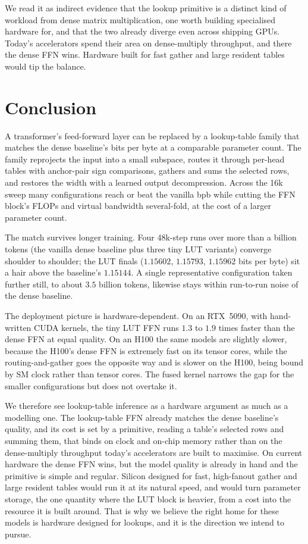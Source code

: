 \documentclass[11pt]{article}
\begin{document}
We read it as indirect evidence
that the lookup primitive is a distinct kind of workload from dense matrix multiplication, one
worth building specialised hardware for, and that the two already diverge even across shipping
GPUs. Today's accelerators spend their area on
dense-multiply throughput, and there the dense FFN wins. Hardware built for fast gather and large
resident tables would tip the balance.

\clearpage
\section{Conclusion}

A transformer's feed-forward layer can be replaced by a lookup-table family that matches the
dense baseline's bits per byte at a comparable parameter count. The family reprojects the input
into a small subspace, routes it through per-head tables with anchor-pair sign comparisons,
gathers and sums the selected rows, and restores the width with a learned output decompression.
Across the 16k sweep many configurations reach or beat the vanilla bpb while cutting the FFN
block's FLOPs and virtual bandwidth several-fold, at the cost of a larger parameter count.

The match survives longer training. Four 48k-step runs over more than a billion tokens (the
vanilla dense baseline plus three tiny LUT variants) converge shoulder to shoulder; the LUT
finals ($1.15602$, $1.15793$, $1.15962$ bits per byte) sit a hair above the baseline's $1.15144$. A
single representative configuration taken further still, to about $3.5$ billion tokens, likewise
stays within run-to-run noise of the dense baseline.

The deployment picture is hardware-dependent. On an RTX~5090, with hand-written CUDA
kernels, the tiny LUT FFN runs $1.3$ to $1.9$ times faster than the dense FFN at equal quality.
On an H100 the same models are slightly slower, because the H100's dense FFN is extremely fast on
its tensor cores, while the routing-and-gather goes the opposite way and is slower on the H100,
being bound by SM clock rather than tensor cores. The fused kernel narrows the gap for the
smaller configurations but does not overtake it.

We therefore see lookup-table inference as a hardware argument as much as a modelling one. The
lookup-table FFN already matches the dense baseline's quality, and its cost is set by a primitive, reading a
table's selected rows and summing them, that binds on clock and on-chip memory rather than on the
dense-multiply throughput today's accelerators are built to maximise. On current hardware the
dense FFN wins, but the model quality is already in hand and the primitive is simple and regular.
Silicon designed for fast, high-fanout gather and large resident tables would run it at its
natural speed, and would turn parameter storage, the one quantity where the LUT block is heavier,
from a cost into the resource it is built around. That is why we believe the right home for these
models is hardware designed for lookups, and it is the direction we intend to pursue.
\end{document}
